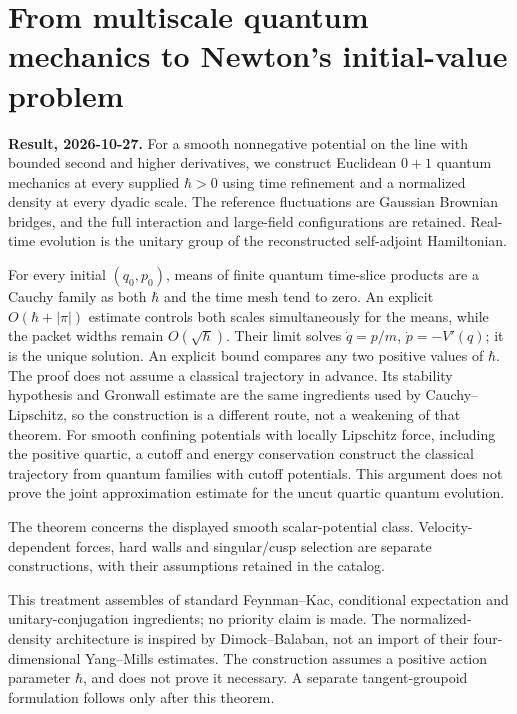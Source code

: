 \documentclass[11pt,a4paper]{article}
\begin{document}
\hypertarget{from-multiscale-quantum-mechanics-to-newtons-initial-value-problem}{%
\section{From multiscale quantum mechanics to Newton's initial-value
problem}\label{from-multiscale-quantum-mechanics-to-newtons-initial-value-problem}}

\textbf{Result, 2026-10-27.} For a smooth nonnegative potential on the
line with bounded second and higher derivatives, we construct Euclidean
\(0+1\) quantum mechanics at every supplied \(\hbar>0\) using time
refinement and a normalized density at every dyadic scale. The reference
fluctuations are Gaussian Brownian bridges, and the full interaction and
large-field configurations are retained. Real-time evolution is the
unitary group of the reconstructed self-adjoint Hamiltonian.

For every initial \((q_0,p_0)\), means of finite quantum time-slice
products are a Cauchy family as both \(\hbar\) and the time mesh tend to
zero. An explicit \(O(\hbar+|\pi|)\) estimate controls both scales
simultaneously for the means, while the packet widths remain
\(O(\sqrt \hbar)\). Their limit solves \(\dot q=p/m\),
\(\dot p=-V'(q)\); it is the unique solution. An explicit bound compares
any two positive values of \(\hbar\). The proof does not assume a
classical trajectory in advance. Its stability hypothesis and Gronwall
estimate are the same ingredients used by Cauchy--Lipschitz, so the
construction is a different route, not a weakening of that theorem. For
smooth confining potentials with locally Lipschitz force, including the
positive quartic, a cutoff and energy conservation construct the
classical trajectory from quantum families with cutoff potentials. This
argument does not prove the joint approximation estimate for the uncut
quartic quantum evolution.

The theorem concerns the displayed smooth scalar-potential class.
Velocity-dependent forces, hard walls and singular/cusp selection are
separate constructions, with their assumptions retained in the catalog.

This treatment assembles of standard Feynman--Kac, conditional
expectation and unitary-conjugation ingredients; no priority claim is
made. The normalized-density architecture is inspired by
Dimock--Balaban, not an import of their four-dimensional Yang--Mills
estimates. The construction assumes a positive action parameter
\(\hbar\), and does not prove it necessary. A separate tangent-groupoid
formulation follows only after this theorem.
\end{document}
